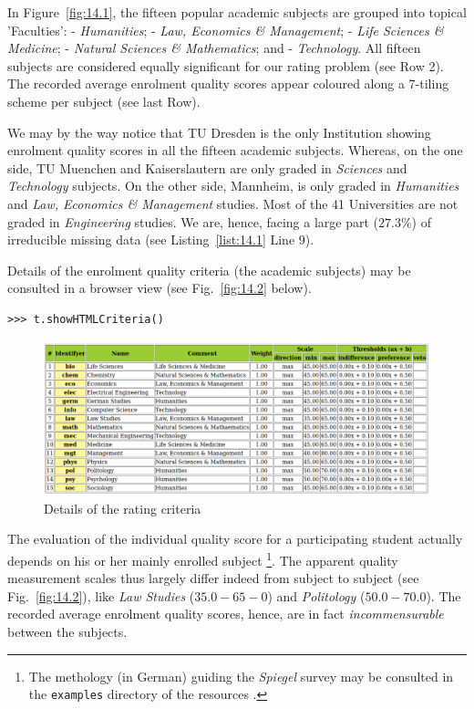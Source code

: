 In Figure~\vref{fig:14.1}, the fifteen popular academic subjects are grouped into topical 'Faculties': - \emph{Humanities}; - \emph{Law, Economics \& Management}; - \emph{Life Sciences \& Medicine}; - \emph{Natural Sciences \& Mathematics}; and - \emph{Technology}. All fifteen subjects are considered equally significant for our rating problem (see Row 2). The recorded average enrolment quality scores appear coloured along a 7-tiling scheme per subject (see last Row).

We may by the way notice that TU Dresden is the only Institution showing enrolment quality scores in all the fifteen academic subjects. Whereas, on the one side, TU Muenchen and Kaiserslautern are only graded in \emph{Sciences} and \emph{Technology} subjects. On the other side, Mannheim, is only graded in \emph{Humanities} and \emph{Law, Economics \& Management} studies. Most of the 41 Universities are not graded in \emph{Engineering} studies. We are, hence, facing a large part ($27.3\%$) of irreducible missing data (see Listing~\vref{list:14.1} Line 9).

Details of the enrolment quality criteria (the academic subjects) may be consulted in a browser view (see Fig.~\vref{fig:14.2} below).
\begin{lstlisting}
>>> t.showHTMLCriteria()
\end{lstlisting}
 \begin{figure}[ht]
\includegraphics[width=\hsize]{Figures/14-2-spiegelCriteria.png}
\caption{Details of the rating criteria}
\label{fig:14.2}       %
\end{figure}

The evaluation of the individual quality score for a participating student actually depends on his or her mainly enrolled subject \footnote{The methology (in German) guiding the \emph{Spiegel} survey may be consulted in the \texttt{examples} directory of the \Digraph resources \citep{SPI-2004m}.}. The apparent quality measurement scales thus largely differ indeed from subject to subject (see Fig.~\vref{fig:14.2}), like \emph{Law Studies} ($35.0 - 65-0$) and \emph{Politology} ($50.0 - 70.0$). The recorded average enrolment quality scores, hence, are in fact \emph{incommensurable} between the subjects.

